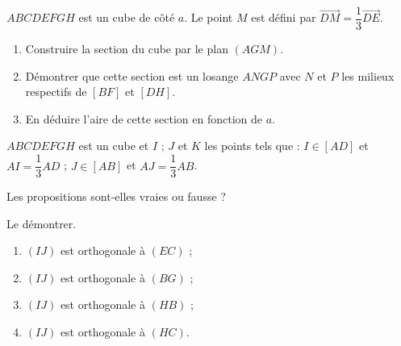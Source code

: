 \begin{colonne*exercice}
  \begin{exercice}
    $ABCDEFGH$ est un cube de côté $a$. Le point $M$ est défini par
    $\overrightarrow{DM}=\dfrac{1}{3}\overrightarrow{DE}$.
    \begin{enumerate}
    \item Construire la section du cube par le plan $(AGM)$.
    \item Démontrer que cette section est un losange $ANGP$ avec $N$
      et $P$ les milieux respectifs de $[BF]$ et $[DH]$.
    \item En déduire l'aire de cette section en fonction de $a$.
    \end{enumerate}
  \end{exercice}

  \begin{exercice}
    $ABCDEFGH$ est un cube et $I$ ; $J$ et $K$ les points tels que :
    $I\in [AD]$ et $AI=\dfrac{1}{3}AD$ ; $J\in [AB]$ et
    $AJ=\dfrac{1}{3}AB$.

    \begin{center}
      
    \end{center}

    Les propositions sont-elles vraies ou fausse ?

    Le démontrer.
    \begin{enumerate}
    \item $(IJ)$ est orthogonale à $(EC)$ ; \item $(IJ)$ est
      orthogonale à $(BG)$ ;
    \item $(IJ)$ est orthogonale à $(HB)$ ; \item $(IJ)$ est
      orthogonale à $(HC)$.
    \end{enumerate}
  \end{exercice}


\end{colonne*exercice}
